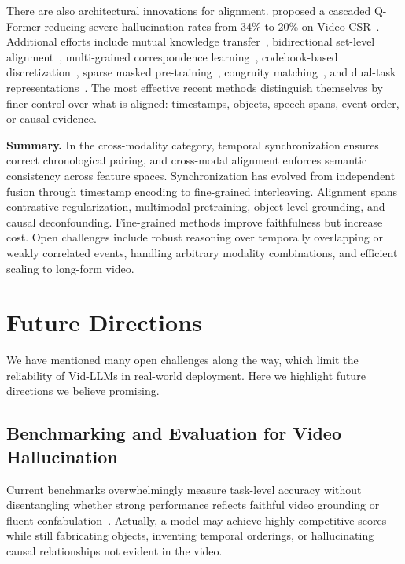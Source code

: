 \documentclass[10pt]{article} %
\newcommand{\todo}[1]{\textcolor{red}{[TODO: #1]}}
\begin{document}
There are also architectural innovations for alignment. \citet{Liu2023VideoTellerEC} proposed a cascaded Q-Former reducing severe hallucination rates from 34\% to 20\% on Video-CSR~\citep{liu2023video}. Additional efforts include mutual knowledge transfer~\citep{Weng2022VisualAL}, bidirectional set-level alignment~\citep{Wang2023LearningGV}, multi-grained correspondence learning~\citep{Wang2024GEXIAGE}, codebook-based discretization~\citep{Zhu2025VTDCLIPVD}, sparse masked pre-training~\citep{Lin2022SMAUGSM}, congruity matching~\citep{Zeng2023TVTSv2LO}, and dual-task representations~\citep{Wang2024DualTaskMR}. The most effective recent methods distinguish themselves by finer control over what is aligned: timestamps, objects, speech spans, event order, or causal evidence.

\textbf{Summary.} In the cross-modality category, temporal synchronization ensures correct chronological pairing, and cross-modal alignment enforces semantic consistency across feature spaces. Synchronization has evolved from independent fusion through timestamp encoding to fine-grained interleaving. Alignment spans contrastive regularization, multimodal pretraining, object-level grounding, and causal deconfounding. Fine-grained methods improve faithfulness but increase cost. Open challenges include robust reasoning over temporally overlapping or weakly correlated events, handling arbitrary modality combinations, and efficient scaling to long-form video.

\section{Future Directions}
\label{sec:future_directions}
We have mentioned many open challenges along the way, which limit the reliability of Vid-LLMs in real-world deployment. Here we highlight future directions we believe promising.

\subsection{Benchmarking and Evaluation for Video Hallucination}
Current benchmarks overwhelmingly measure task-level accuracy without disentangling whether strong performance reflects faithful video grounding or fluent confabulation~\citep{Maaz2023VideoChatGPTTD, Zhang2024LLaVAVideoVI}. Actually, a model may achieve highly competitive scores while still fabricating objects, inventing temporal orderings, or hallucinating causal relationships not evident in the video.
\end{document}
